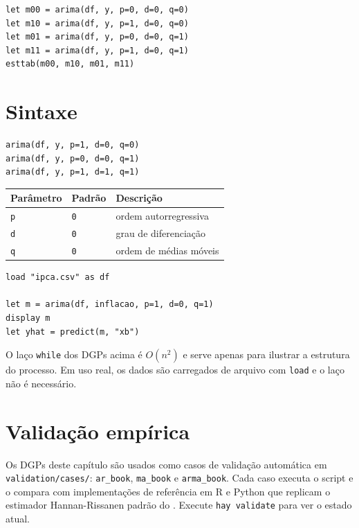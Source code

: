 \begin{lstlisting}[caption={Seleção de ordem por AIC}]
let m00 = arima(df, y, p=0, d=0, q=0)
let m10 = arima(df, y, p=1, d=0, q=0)
let m01 = arima(df, y, p=0, d=0, q=1)
let m11 = arima(df, y, p=1, d=0, q=1)
esttab(m00, m10, m01, m11)
\end{lstlisting}

\section{Sintaxe}

\begin{lstlisting}
arima(df, y, p=1, d=0, q=0)
arima(df, y, p=0, d=0, q=1)
arima(df, y, p=1, d=1, q=1)
\end{lstlisting}

\begin{center}
\begin{tabular}{lll}
\toprule
\textbf{Parâmetro} & \textbf{Padrão} & \textbf{Descrição} \\
\midrule
\texttt{p} & \texttt{0} & ordem autorregressiva \\
\texttt{d} & \texttt{0} & grau de diferenciação \\
\texttt{q} & \texttt{0} & ordem de médias móveis \\
\bottomrule
\end{tabular}
\end{center}

\begin{lstlisting}[caption={Fluxo típico com dados reais}]
load "ipca.csv" as df

let m = arima(df, inflacao, p=1, d=0, q=1)
display m
let yhat = predict(m, "xb")
\end{lstlisting}

\begin{nota}
  O laço \lstinline{while} dos DGPs acima é $O(n^2)$ e serve apenas para
  ilustrar a estrutura do processo. Em uso real, os dados são carregados
  de arquivo com \lstinline{load} e o laço não é necessário.
\end{nota}

\section{Validação empírica}

Os DGPs deste capítulo são usados como casos de validação automática em
\texttt{validation/cases/}: \texttt{ar\_book}, \texttt{ma\_book} e
\texttt{arma\_book}. Cada caso executa o script \hayashi{} e o compara com
implementações de referência em R e Python que replicam o estimador
Hannan-Rissanen padrão do \hayashi{}. Execute \lstinline{hay validate} para
ver o estado atual.
